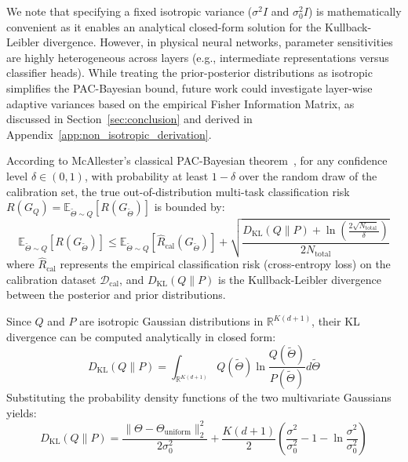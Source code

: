 \begin{remark}
We note that specifying a fixed isotropic variance ($\sigma^2 I$ and $\sigma_0^2 I$) is mathematically convenient as it enables an analytical closed-form solution for the Kullback-Leibler divergence. However, in physical neural networks, parameter sensitivities are highly heterogeneous across layers (e.g., intermediate representations versus classifier heads). While treating the prior-posterior distributions as isotropic simplifies the PAC-Bayesian bound, future work could investigate layer-wise adaptive variances based on the empirical Fisher Information Matrix, as discussed in Section~\ref{sec:conclusion} and derived in Appendix~\ref{app:non_isotropic_derivation}.
\end{remark}

According to McAllester's classical PAC-Bayesian theorem~\cite{mcallester1999pac}, for any confidence level $\delta \in (0, 1)$, with probability at least $1-\delta$ over the random draw of the calibration set, the true out-of-distribution multi-task classification risk $R(G_Q) = \mathbb{E}_{\tilde{\Theta} \sim Q}[R(G_{\tilde{\Theta}})]$ is bounded by:
\begin{equation}
\label{eq:mcallester}
\mathbb{E}_{\tilde{\Theta} \sim Q}[R(G_{\tilde{\Theta}})] \le \mathbb{E}_{\tilde{\Theta} \sim Q}[\widehat{R}_{\text{cal}}(G_{\tilde{\Theta}})] + \sqrt{\frac{D_{\text{KL}}(Q \parallel P) + \ln\left(\frac{2\sqrt{N_{\text{total}}}}{\delta}\right)}{2 N_{\text{total}}}}
\end{equation}
where $\widehat{R}_{\text{cal}}$ represents the empirical classification risk (cross-entropy loss) on the calibration dataset $\mathcal{D}_{\text{cal}}$, and $D_{\text{KL}}(Q \parallel P)$ is the Kullback-Leibler divergence between the posterior and prior distributions.

Since $Q$ and $P$ are isotropic Gaussian distributions in $\mathbb{R}^{K(d+1)}$, their KL divergence can be computed analytically in closed form:
\begin{equation}
D_{\text{KL}}(Q \parallel P) = \int_{\mathbb{R}^{K(d+1)}} Q(\tilde{\Theta}) \ln \frac{Q(\tilde{\Theta})}{P(\tilde{\Theta})} d\tilde{\Theta}
\end{equation}
Substituting the probability density functions of the two multivariate Gaussians yields:
\begin{equation}
\label{eq:kl_derivation}
D_{\text{KL}}(Q \parallel P) = \frac{\|\Theta - \Theta_{\text{uniform}}\|_2^2}{2 \sigma_0^2} + \frac{K(d+1)}{2} \left( \frac{\sigma^2}{\sigma_0^2} - 1 - \ln \frac{\sigma^2}{\sigma_0^2} \right)
\end{equation}

